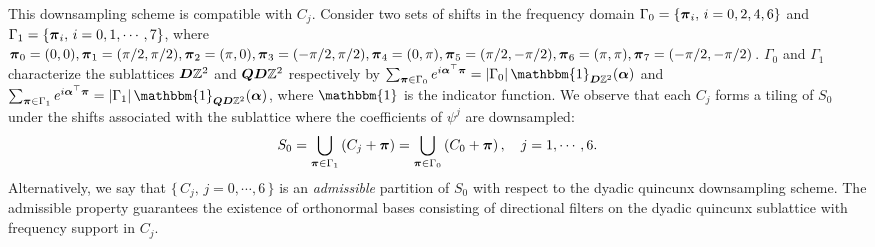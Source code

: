 This downsampling scheme is compatible with $C_j$. Consider two sets of shifts in the frequency domain $\Gamma_0= \{\boldsymbol{\pi}_i,\, i = 0,2,4,6\}$ and $\Gamma_1 = \{\boldsymbol{\pi}_i,\, i = 0,1,\cdots,7\}$, where {\small $\boldsymbol{\pi}_0 = (0,0), \boldsymbol{\pi}_1 = (\pi/2,\pi/2), \boldsymbol{\pi}_2 = (\pi,0),\boldsymbol{\pi}_3 = (-\pi/2,\pi/2), \boldsymbol{\pi}_4 = (0,\pi), \boldsymbol{\pi}_5 = (\pi/2,-\pi/2),\boldsymbol{\pi}_6 = (\pi,\pi), \boldsymbol{\pi}_7=(-\pi/2,-\pi/2)$}. $\Gamma_0$ and $\Gamma_1$ characterize the sublattices $\boldsymbol{D}\mathbb{Z}^2$ and $\boldsymbol{QD}\mathbb{Z}^2$ respectively by
$\sum_{\V{\pi}\in\Gamma_0}e^{i\V{\alpha}^\top\V{\pi}} = |\Gamma_0| \, \mathbbm{1}_{\V{D}\mathbb{Z}^2}(\V{\alpha})$ and $ \sum_{\V{\pi}\in\Gamma_1}e^{i\V{\alpha}^\top\V{\pi}} = |\Gamma_1| \, \mathbbm{1}_{\V{QD}\mathbb{Z}^2}(\V{\alpha})$, where $\mathbbm{1}$ is the indicator function. 
We observe that each $C_j$ forms a tiling of $S_0$ under the shifts associated with the sublattice where the coefficients of $\psi^j$ are downsampled:
\begin{align}\label{eq: tiling}
S_0 = \bigcup_{\boldsymbol{\pi}\in\Gamma_1}\left(C_j + \boldsymbol{\pi}\right) = \bigcup_{\boldsymbol{\pi}\in\Gamma_0}\left(C_0 + \boldsymbol{\pi}\right),\quad j = 1,\cdots,6.
\end{align}
Alternatively, we say that $\{\,C_j,\, j = 0,\cdots,6\,\}$ is an {\it admissible} partition of $S_0$ with respect to the dyadic quincunx downsampling scheme.
The admissible property guarantees the existence of orthonormal bases consisting of directional filters on the dyadic quincunx sublattice with frequency support in $C_j$.